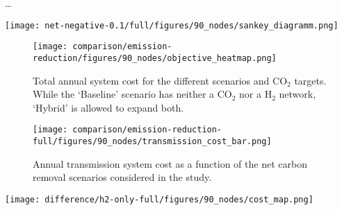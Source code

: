 \documentclass[twocolumn]{article}
\newcommand{\carbon}{CO$_2$}
\newcommand{\hydrogen}{H$_2$}
\newcommand{\hydrogengrid}{\hydrogen{}--Grid}
\begin{document}
\dots





\printbibliography

\appendix


\begin{figure*}
    \centering
    \texttt{[image: net-negative-0.1/full/figures/90\_nodes/sankey\_diagramm.png]}
    \caption{Sankey diagram of the optimal operation for a net-negative 10\% scenario.}
    \label{fig:sankey_diagramm}
\end{figure*}

\begin{figure}
    \centering
    \texttt{[image: comparison/emission-reduction/figures/90\_nodes/objective\_heatmap.png]}
    \caption{Total annual system cost for the different scenarios and \carbon{} targets. While the `Baseline' scenario has neither a \carbon{} nor a \hydrogen{} network, `Hybrid' is allowed to expand both.}
    \label{fig:objective_heatmap}
\end{figure}


\begin{figure}[ht]
    \centering
    \texttt{[image: comparison/emission-reduction-full/figures/90\_nodes/transmission\_cost\_bar.png]}
    \caption{Annual transmission system cost as a function of the net carbon removal scenarios considered in the study.}
    \label{fig:transmission_cost_bar}
\end{figure}


\begin{figure*}[ht]
    \centering
    \texttt{[image: difference/h2-only-full/figures/90\_nodes/cost\_map.png]}
    \caption{Difference in cost investments between \hydrogengrid and Hybrid model. The left subfigure shows higher spendings per technology and region and transport system for the \hydrogengrid model, the right shows higher spendings in the Hydrid model.}
    \label{fig:cost_map_difference}
\end{figure*}
\end{document}
